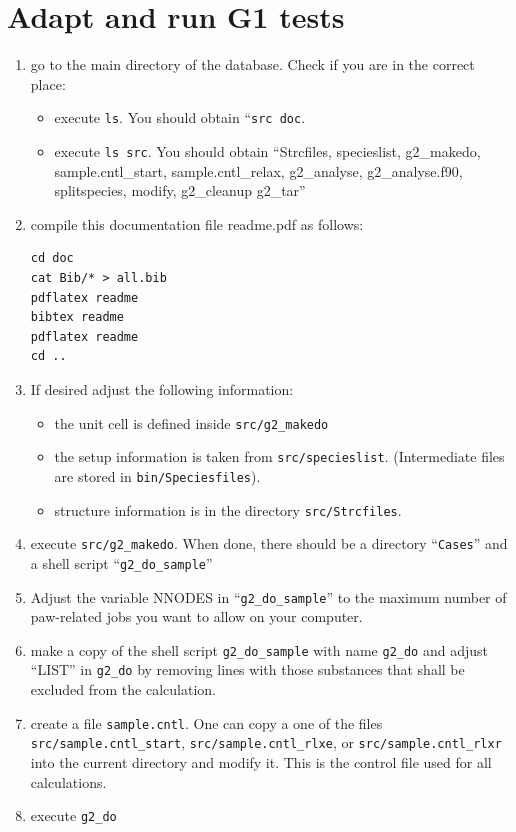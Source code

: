 \documentclass{book}
\begin{document}
\section*{Adapt and run G1 tests}
\begin{enumerate}
\item go to the main directory of the database. Check if you are in
  the correct place:
  \begin{itemize} 
    \item execute \verb|ls|. You should obtain ``\verb|src doc|. 
    \item execute \verb|ls src|. You should obtain ``Strcfiles,
      specieslist, g2\_makedo, sample.cntl\_start,
      sample.cntl\_relax, g2\_analyse, g2\_analyse.f90, splitspecies, 
      modify, g2\_cleanup g2\_tar''
   \end{itemize}
%
\item compile this documentation file readme.pdf as follows:
\begin{verbatim}
cd doc
cat Bib/* > all.bib
pdflatex readme
bibtex readme
pdflatex readme
cd ..
\end{verbatim}
%
\item If desired adjust the following information:
  \begin{itemize}
     \item the unit cell is defined inside \verb|src/g2_makedo|
     \item the setup information is taken from \verb|src/specieslist|.
          (Intermediate files are stored in \verb|bin/Speciesfiles|).
     \item structure information is in the directory \verb|src/Strcfiles|.
  \end{itemize}
%
\item execute \verb|src/g2_makedo|. When done, there should be a
  directory ``\verb|Cases|'' and a shell script ``\verb|g2_do_sample|''
%
\item Adjust the variable NNODES in ``\verb|g2_do_sample|'' to the
  maximum number of paw-related jobs you want to allow on your
  computer.
%
\item make a copy of the shell script \verb|g2_do_sample| with name
  \verb|g2_do| and adjust ``LIST'' in \verb|g2_do| by removing lines
  with those substances that shall be excluded from the calculation.
%
\item create a file \verb|sample.cntl|. One can copy a one of the
  files \verb|src/sample.cntl_start|, \verb|src/sample.cntl_rlxe|, or
  \verb|src/sample.cntl_rlxr| into the current directory and modify
  it. This is the control file used for all calculations.
%
\item execute \verb|g2_do|
%
\end{enumerate}
\end{document}
